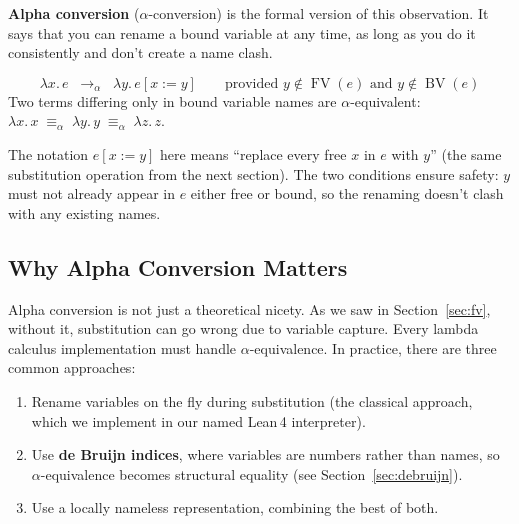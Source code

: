 \documentclass[11pt,a4paper]{article}
\theoremstyle{definition}
\newcommand{\lam}{\lambda}
\newcommand{\af}{\longrightarrow_\alpha}
\newcommand{\aeq}{\equiv_\alpha}
\newcommand{\FV}{\operatorname{FV}}
\newcommand{\BV}{\operatorname{BV}}
\begin{document}
\textbf{Alpha conversion} ($\alpha$-conversion) is the formal version of this
observation. It says that you can rename a bound variable at any time, as long
as you do it consistently and don't create a name clash.

\begin{defnbox}
\[
  \lam x.\, e \;\;\af\;\; \lam y.\, e[x := y]
  \qquad\text{provided } y \notin \FV(e) \text{ and } y \notin \BV(e)
\]
Two terms differing only in bound variable names are $\alpha$-equivalent:
$\lam x.\,x \;\aeq\; \lam y.\,y \;\aeq\; \lam z.\,z$.
\end{defnbox}

The notation $e[x := y]$ here means ``replace every free $x$ in $e$ with $y$''
(the same substitution operation from the next section). The two conditions
ensure safety: $y$ must not already appear in $e$ either free or bound, so the
renaming doesn't clash with any existing names.

\subsection{Why Alpha Conversion Matters}

Alpha conversion is not just a theoretical nicety. As we saw in
Section~\ref{sec:fv}, without it, substitution can go wrong due to variable
capture. Every lambda calculus implementation must handle $\alpha$-equivalence.
In practice, there are three common approaches:
\begin{enumerate}[leftmargin=2em]
\item Rename variables on the fly during substitution (the classical approach,
  which we implement in our named Lean\,4 interpreter).
\item Use \textbf{de Bruijn indices}, where variables are numbers rather than
  names, so $\alpha$-equivalence becomes structural equality (see
  Section~\ref{sec:debruijn}).
\item Use a locally nameless representation, combining the best of both.
\end{enumerate}
\end{document}
